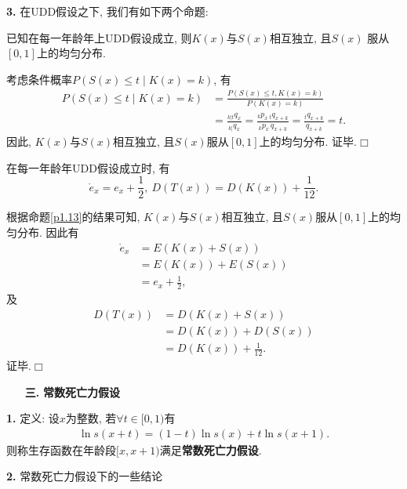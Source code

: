 \documentclass[a4paper,openany, 10pt]{ctexbook}
\newcommand{\hei}{\CJKfamily{hei}}      %
\def\qed{\hfill$\Box$\medskip}
\begin{document}
{\rm\bf3.} 在UDD假设之下, 我们有如下两个命题:

 \begin{proposition}\label{p1.13}已知在每一年龄年上UDD假设成立, 则$K(x)$与$S(x)$相互独立, 且$S(x)$ 服从
 $[0,1]$上的均匀分布.
\end{proposition}
\proof
考虑条件概率$P(S(x) \leq t \mid K(x) = k)$, 有
\begin{align*}
    P(S(x) \leq t \mid K(x) = k) & = \frac{P(S(x) \leq t, K(x) = k)}{P(K(x) = k)}                                                                          \\
                                 & = \frac{_{k|t}q_{x}}{_{k|}q_{x}} = \frac{_{k}p_{x}\,_{t}q_{x+k}}{_{k}p_{x}\,q_{x+k}} = \frac{_{t}q_{x+k}}{q_{x+k}} = t.
\end{align*}
因此, $K(x)$与$S(x)$相互独立, 且$S(x)$服从$[0,1]$上的均匀分布. 证毕.\qed

\begin{proposition}在每一年龄年UDD假设成立时, 有
    $$\mathring{e}_{x}=e_{x}+\frac{1}{2},\   D(T(x))=D(K(x))+\frac{1}{12}.$$
\end{proposition}
\proof
根据命题\ref{p1.13}的结果可知, $K(x)$与$S(x)$相互独立, 且$S(x)$服从$[0,1]$上的均匀分布. 因此有
\begin{align*}
    \mathring{e}_{x} & =E(K(x)+S(x))        \\
                     & = E(K(x))+E(S(x))    \\
                     & = e_{x}+\frac{1}{2},
\end{align*}
及\begin{align*}
    D(T(x)) & =D(K(x)+S(x))             \\
                     & =D(K(x))+D(S(x)) \\
                     & =D(K(x))+\frac{1}{12}.
\end{align*}
证毕.\qed

\begin{itemize}
    \item[{\bf\hei 三.}]{\bf\hei 常数死亡力假设}
\end{itemize}

{\rm\bf1.}  定义: 设$x$为整数, 若$\forall t\in [0,1)$有
\begin{align}\label{tulb}
    \ln s(x+t)=(1-t)\ln s(x)+t\ln s(x+1).
\end{align}
则称生存函数在年龄段$[x,x+1)$满足\textbf{常数死亡力假设}.

{\rm\bf2.} 常数死亡力假设下的一些结论
\end{document}
